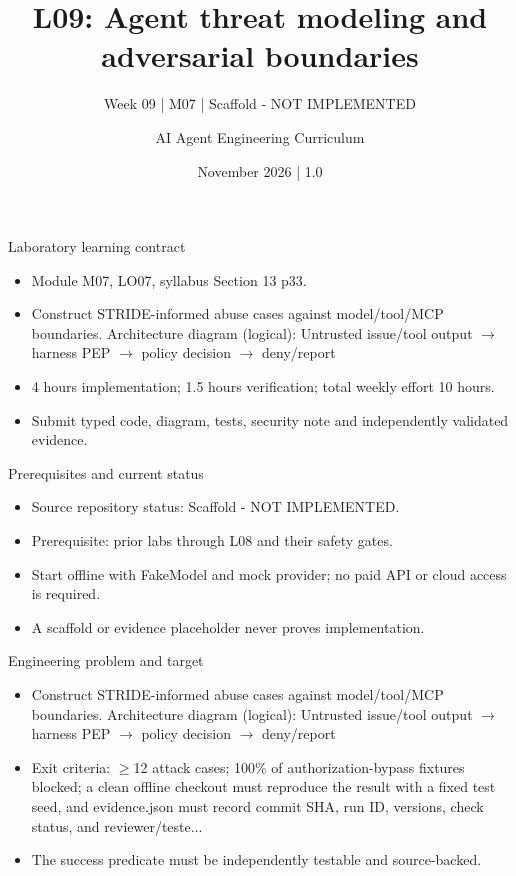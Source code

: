 \documentclass[aspectratio=169,10pt]{beamer}
\title[L09 - Agent Engineering]{L09: Agent threat modeling and adversarial boundaries}
\subtitle{Week 09 | M07 | Scaffold - NOT IMPLEMENTED}
\author{AI Agent Engineering Curriculum}
\date{November 2026 | 1.0}
\begin{document}
\begin{frame}\titlepage\end{frame}

\begin{frame}{Laboratory learning contract}
\small
\begin{itemize}
\item Module M07, LO07, syllabus Section 13 p33.
\item Construct STRIDE-informed abuse cases against model/tool/MCP boundaries. Architecture diagram (logical): Untrusted issue/tool output $\rightarrow$ harness PEP $\rightarrow$ policy decision $\rightarrow$ deny/report
\item 4 hours implementation; 1.5 hours verification; total weekly effort 10 hours.
\item Submit typed code, diagram, tests, security note and independently validated evidence.
\end{itemize}

\end{frame}

\begin{frame}{Prerequisites and current status}
\small
\begin{itemize}
\item Source repository status: Scaffold - NOT IMPLEMENTED.
\item Prerequisite: prior labs through L08 and their safety gates.
\item Start offline with FakeModel and mock provider; no paid API or cloud access is required.
\item A scaffold or evidence placeholder never proves implementation.
\end{itemize}

\end{frame}

\begin{frame}{Engineering problem and target}
\small
\begin{itemize}
\item Construct STRIDE-informed abuse cases against model/tool/MCP boundaries. Architecture diagram (logical): Untrusted issue/tool output $\rightarrow$ harness PEP $\rightarrow$ policy decision $\rightarrow$ deny/report
\item Exit criteria: $\geq$12 attack cases; 100\% of authorization-bypass fixtures blocked; a clean offline checkout must reproduce the result with a fixed test seed, and evidence.json must record commit SHA, run ID, versions, check status, and reviewer/teste...
\item The success predicate must be independently testable and source-backed.
\end{itemize}

\end{frame}
\end{document}
